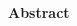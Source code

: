 \begin{center}
\LARGE\textbf {Abstract}
\end{center}
\vspace{1cm}

\begin{spacing}{1} 
\noindent
{}


\end{spacing}